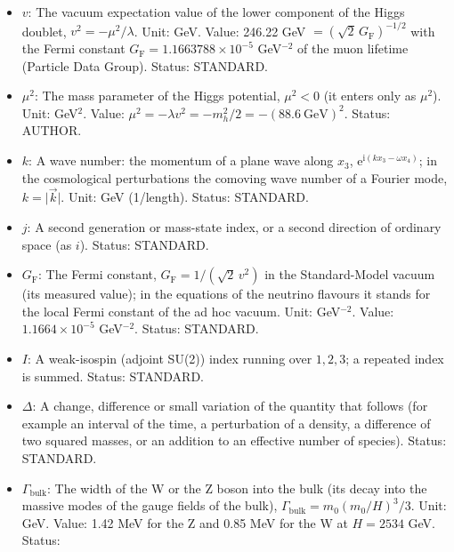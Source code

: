 \documentclass[
  10pt,
]{article}
\begin{document}
\begin{itemize}
  label the mass of a mode of a field of the bulk as the fold sees it,
  \(m^2 = \omega^2 - k^2\); for the W and Z bosons their complex pole
  mass, \(m^2 = m_0^2 - \mathrm{i}m_0\Gamma_{\mathrm{bulk}}\) to the
  leading order; in the relic abundance of the particles \(\chi\) their
  mass. Unit: GeV. Status: STANDARD.
\item
  \(v\): The vacuum expectation value of the lower component of the
  Higgs doublet, \(v^2 = -\mu^2/\lambda\). Unit: GeV. Value: 246.22 GeV
  \(= (\sqrt2\,G_{\mathrm{F}})^{-1/2}\) with the Fermi constant
  \(G_{\mathrm{F}} = 1.1663788\times10^{-5}\) GeV\(^{-2}\) of the muon
  lifetime (Particle Data Group). Status: STANDARD.
\item
  \(\mu^2\): The mass parameter of the Higgs potential, \(\mu^2 < 0\)
  (it enters only as \(\mu^2\)). Unit: GeV\(^2\). Value:
  \(\mu^2 = -\lambda v^2 = -m_h^2/2 = -(88.6\ \mathrm{GeV})^2\). Status:
  AUTHOR.
\item
  \(k\): A wave number: the momentum of a plane wave along \(x_3\),
  \(\mathrm{e}^{\mathrm{i}(kx_3 - \omega x_4)}\); in the cosmological
  perturbations the comoving wave number of a Fourier mode,
  \(k = \lvert\vec k\rvert\). Unit: GeV (1/length). Status: STANDARD.
\item
  \(j\): A second generation or mass-state index, or a second direction
  of ordinary space (as \(i\)). Status: STANDARD.
\item
  \(G_{\mathrm{F}}\): The Fermi constant,
  \(G_{\mathrm{F}} = 1/(\sqrt2\,v^2)\) in the Standard-Model vacuum (its
  measured value); in the equations of the neutrino flavours it stands
  for the local Fermi constant of the ad hoc vacuum. Unit: GeV\(^{-2}\).
  Value: \(1.1664\times10^{-5}\) GeV\(^{-2}\). Status: STANDARD.
\item
  \(I\): A weak-isospin (adjoint SU(2)) index running over \(1, 2, 3\);
  a repeated index is summed. Status: STANDARD.
\item
  \(\Delta\): A change, difference or small variation of the quantity
  that follows (for example an interval of the time, a perturbation of a
  density, a difference of two squared masses, or an addition to an
  effective number of species). Status: STANDARD.
\item
  \(\Gamma_{\mathrm{bulk}}\): The width of the W or the Z boson into the
  bulk (its decay into the massive modes of the gauge fields of the
  bulk), \(\Gamma_{\mathrm{bulk}} = m_0(m_0/H)^3/3\). Unit: GeV. Value:
  1.42 MeV for the Z and 0.85 MeV for the W at \(H = 2534\) GeV. Status:

\end{itemize}
\end{document}
